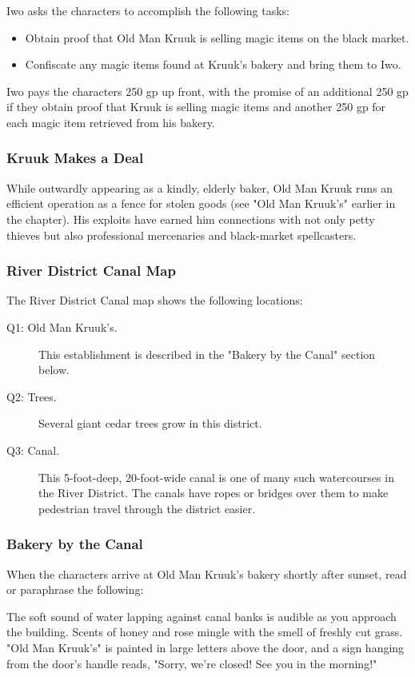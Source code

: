 \documentclass[10pt,a4paper,twoside,fancy,bg=print,twocolumn,openany,nodeprecatedcode]{dndbook}
\begin{document}
Iwo asks the characters to accomplish the following tasks:


\begin{itemize}
\item Obtain proof that Old Man Kruuk is selling magic items on the black market.
\item Confiscate any magic items found at Kruuk's bakery and bring them to Iwo.
\end{itemize}

Iwo pays the characters 250 gp up front, with the promise of an additional 250 gp if they obtain proof that Kruuk is selling magic items and another 250 gp for each magic item retrieved from his bakery.

\subsubsection{Kruuk Makes a Deal}
While outwardly appearing as a kindly, elderly baker, Old Man Kruuk runs an efficient operation as a fence for stolen goods (see "Old Man Kruuk's" earlier in the chapter). His exploits have earned him connections with not only petty thieves but also professional mercenaries and black-market spellcasters.

\subsubsection{River District Canal Map}
The River District Canal map shows the following locations:


\begin{description}
\item[Q1: Old Man Kruuk's.]
This establishment is described in the "Bakery by the Canal" section below.
\item[Q2: Trees.]
Several giant cedar trees grow in this district.
\item[Q3: Canal.]
This 5-foot-deep, 20-foot-wide canal is one of many such watercourses in the River District. The canals have ropes or bridges over them to make pedestrian travel through the district easier.
\end{description}

\subsubsection{Bakery by the Canal}
When the characters arrive at Old Man Kruuk's bakery shortly after sunset, read or paraphrase the following:

\begin{DndReadAloud}{}
The soft sound of water lapping against canal banks is audible as you approach the building. Scents of honey and rose mingle with the smell of freshly cut grass. "Old Man Kruuk's" is painted in large letters above the door, and a sign hanging from the door's handle reads, "Sorry, we're closed! See you in the morning!"

\end{DndReadAloud}
\end{document}
